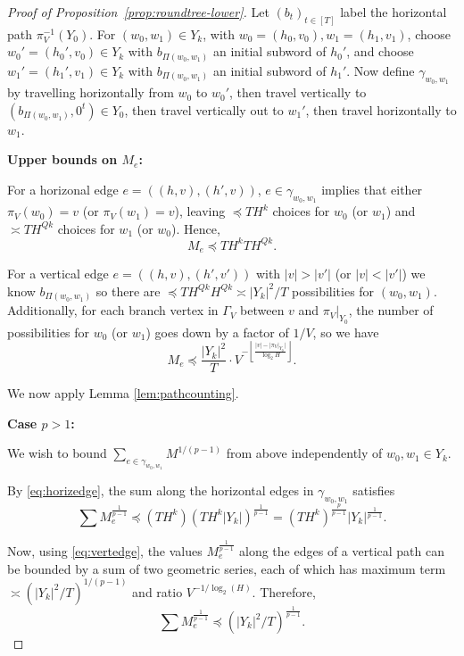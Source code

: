 \documentclass[11pt]{amsart}
\numberwithin{equation}{section}
\theoremstyle{citing}
\numberwithin{equation}{section}
\begin{document}
\begin{proof}[Proof of Proposition~\ref{prop:roundtree-lower}]
	Let $(b_t)_{t \in [T]}$ label the horizontal path $\pi_V^{-1}(Y_0)$.
	For $(w_0,w_1) \in Y_k$, with $w_0=(h_0,v_0), w_1=(h_1,v_1)$, choose
	$w_0'=(h_0',v_0) \in Y_k$ with $b_{\Pi(w_0,w_1)}$ an initial subword of $h_0'$, 
	and choose $w_1'=(h_1',v_1) \in Y_k$ with $b_{\Pi(w_0,w_1)}$ an initial subword of $h_1'$.
	Now define $\gamma_{w_0,w_1}$ by travelling horizontally from $w_0$ to $w_0'$, 
	then travel vertically to $(b_{\Pi(w_0,w_1)},0^t) \in Y_0$, 
	then travel vertically out to $w_1'$, then travel horizontally to $w_1$.

\smallskip
{\noindent\textbf{Upper bounds on $M_e$:}}

    For a horizonal edge $e = ((h,v),(h',v))$, $e \in \gamma_{w_0,w_1}$ implies that either $\pi_V(w_0)=v$ (or $\pi_V(w_1)=v$), leaving $\preceq TH^k$ choices for $w_0$ (or $w_1$) and $\asymp TH^{Qk}$ choices for $w_1$ (or $w_0$). Hence,
    \begin{equation}\label{eq:horizedge}
        M_e \preceq TH^{k}TH^{Qk}. 
    \end{equation}

    For a vertical edge $e = ((h,v),(h',v'))$ with $|v|>|v'|$ (or $|v|<|v'|$) we know $b_{\Pi(w_0,w_1)}$ so there are $\preceq TH^{Qk} H^{Qk} \asymp |Y_k|^2/T$ possibilities for $(w_0,w_1)$. Additionally, for each branch vertex in $\Gamma_V$ between $v$ and $\pi_V|_{Y_0}$, the number of possibilities for $w_0$ (or $w_1$) goes down by a factor of $1/V$, so we have
    \begin{equation}\label{eq:vertedge}
        M_e \preceq \frac{|Y_k|^2}{T} \cdot V^{- \left\lfloor\frac{|v|-|\pi_V|_{Y_0}|}{\log_2H}\right\rfloor}.
    \end{equation}

    We now apply Lemma \ref{lem:pathcounting}. 
    
\smallskip\noindent\textbf{Case $p>1$:}


	We wish to bound $\sum_{e \in \gamma_{w_0,w_1}} M^{1/(p-1)}$ from above independently of $w_0,w_1 \in Y_k$.
	
	By \eqref{eq:horizedge}, the sum along the horizontal edges in $\gamma_{w_0,w_1}$ satisfies
	\begin{equation}
		\label{eq:paths1}
		\sum M_e^{\frac{1}{p-1}} \preceq (TH^k) \left( TH^k |Y_k| \right)^{\frac{1}{p-1}} = (TH^k)^{\frac{p}{p-1}} |Y_k|^{\frac{1}{p-1}}.
	\end{equation}

	Now, using \eqref{eq:vertedge}, the values $M_e^{\frac{1}{p-1}}$ along the edges of a vertical path can be bounded by a sum of two geometric series, each of which has maximum term $\asymp \left(|Y_k|^2 /T \right)^{1/(p-1)}$ and ratio $V^{-1/\log_2(H)}$. Therefore,
	\begin{equation}
		\label{eq:paths2}
		\sum M_e^{\frac{1}{p-1}} \preceq \left( |Y_k|^2 / T  \right)^{\frac{1}{p-1}}.
	\end{equation}
	

\end{proof}
\end{document}

